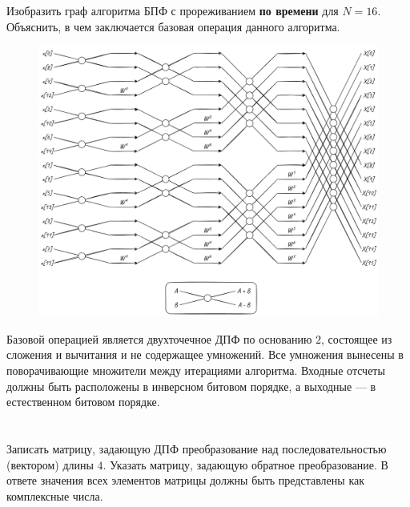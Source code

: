 \section{}
Изобразить граф алгоритма БПФ с прореживанием \textbf{по времени} для $N=16$. 
Объяснить, в чем заключается базовая операция данного алгоритма.
\begin{figure}[!h]
	\centering
	\includegraphics[width=1.\columnwidth]{pics/spring/3/2.png}
	\label{fig:3-2}
\end{figure}

Базовой операцией является двухточечное ДПФ по основанию $2$, состоящее из сложения и вычитания и не содержащее умножений. Все умножения вынесены в поворачивающие множители между итерациями алгоритма. Входные отсчеты должны быть расположены в инверсном битовом порядке, а выходные --- в естественном битовом порядке.



\newpage
\section{}
Записать матрицу, задающую ДПФ преобразование над последовательностью (вектором) длины $4$. Указать матрицу, задающую обратное преобразование. 
В ответе значения всех элементов матрицы должны быть представлены как комплексные числа.

